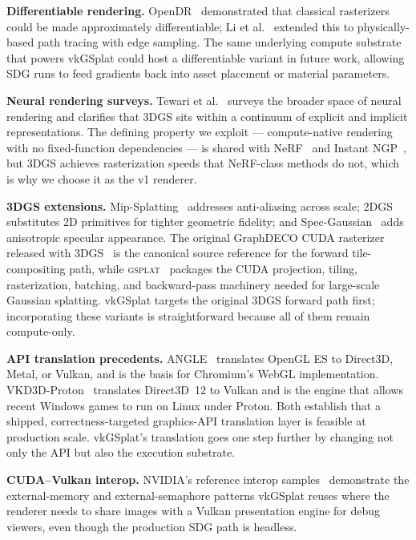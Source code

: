 \documentclass[10pt,journal,onecolumn]{IEEEtran}
\begin{document}
\textbf{Differentiable rendering.}
OpenDR~\cite{loper2014opendr} demonstrated that classical rasterizers
could be made approximately differentiable; Li et
al.~\cite{li2018edge} extended this to physically-based path tracing
with edge sampling. The same underlying compute substrate that powers
vkGSplat could host a differentiable variant in future work, allowing
SDG runs to feed gradients back into asset placement or material
parameters.

\textbf{Neural rendering surveys.} Tewari et al.~\cite{tewari2022advances}
surveys the broader space of neural rendering and clarifies that
3DGS sits within a continuum of explicit and implicit
representations. The defining property we exploit ---
compute-native rendering with no fixed-function dependencies --- is
shared with NeRF~\cite{mildenhall2020nerf} and Instant
NGP~\cite{mueller2022instant}, but 3DGS achieves rasterization speeds
that NeRF-class methods do not, which is why we choose it as the v1
renderer.

\textbf{3DGS extensions.} Mip-Splatting~\cite{yu2024mip}
addresses anti-aliasing across scale; 2DGS~\cite{huang20242dgs}
substitutes 2D primitives for tighter geometric fidelity; and
Spec-Gaussian~\cite{yang2024specgaussian} adds anisotropic specular
appearance. The original GraphDECO CUDA rasterizer released with
3DGS~\cite{kerbl20233dgs} is the canonical source reference for the
forward tile-compositing path, while \textsc{gsplat}~\cite{ye2024gsplat}
packages the CUDA projection, tiling, rasterization, batching, and
backward-pass machinery needed for large-scale Gaussian splatting.
vkGSplat targets the original 3DGS forward path first;
incorporating these variants is straightforward because all of them
remain compute-only.

\textbf{API translation precedents.} ANGLE~\cite{angle} translates
OpenGL ES to Direct3D, Metal, or Vulkan, and is the basis for
Chromium's WebGL implementation. VKD3D-Proton~\cite{vkd3dproton}
translates Direct3D~12 to Vulkan and is the engine that allows recent
Windows games to run on Linux under Proton. Both establish that a
shipped, correctness-targeted graphics-API translation layer is
feasible at production scale. vkGSplat's translation goes one step
further by changing not only the API but also the execution
substrate.

\textbf{CUDA--Vulkan interop.} NVIDIA's reference interop
samples~\cite{nvidia2020vkcuda} demonstrate the external-memory and
external-semaphore patterns vkGSplat reuses where the renderer needs
to share images with a Vulkan presentation engine for debug viewers,
even though the production SDG path is headless.
\end{document}
